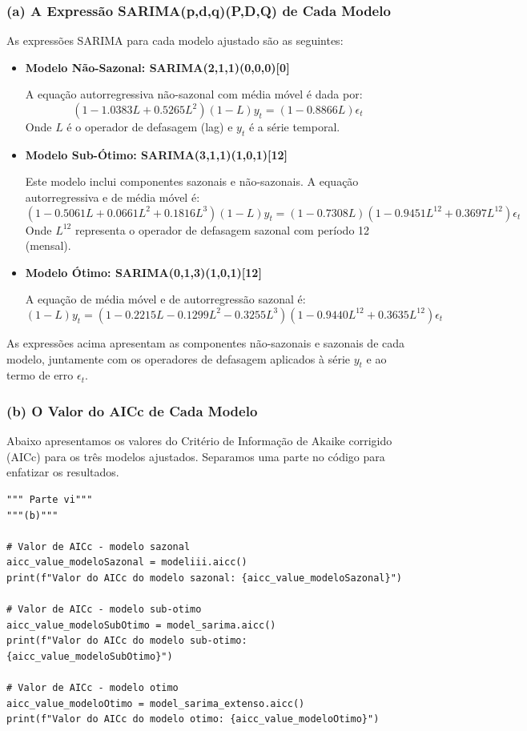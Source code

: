 \documentclass[a4paper, 12pt]{article}
\begin{document}
\subsubsection{(a) A Expressão SARIMA(p,d,q)(P,D,Q) de Cada Modelo}

As expressões SARIMA para cada modelo ajustado são as seguintes:

\begin{itemize}
    \item \textbf{Modelo Não-Sazonal: SARIMA(2,1,1)(0,0,0)[0]}
    
    A equação autorregressiva não-sazonal com média móvel é dada por:
    \[
    (1 - 1.0383L + 0.5265L^2)(1 - L)y_t = (1 - 0.8866L)\epsilon_t
    \]
    Onde \(L\) é o operador de defasagem (lag) e \(y_t\) é a série temporal. 

    \item \textbf{Modelo Sub-Ótimo: SARIMA(3,1,1)(1,0,1)[12]}
    
    Este modelo inclui componentes sazonais e não-sazonais. A equação autorregressiva e de média móvel é:
    \[
    (1 - 0.5061L + 0.0661L^2 + 0.1816L^3)(1 - L)y_t = (1 - 0.7308L)(1 - 0.9451L^{12} + 0.3697L^{12})\epsilon_t
    \]
    Onde \(L^{12}\) representa o operador de defasagem sazonal com período 12 (mensal).
    
    \item \textbf{Modelo Ótimo: SARIMA(0,1,3)(1,0,1)[12]}
    
    A equação de média móvel e de autorregressão sazonal é:
    \[
    (1 - L)y_t = (1 - 0.2215L - 0.1299L^2 - 0.3255L^3)(1 - 0.9440L^{12} + 0.3635L^{12})\epsilon_t
    \]
\end{itemize}

As expressões acima apresentam as componentes não-sazonais e sazonais de cada modelo, juntamente com os operadores de defasagem aplicados à série \(y_t\) e ao termo de erro \(\epsilon_t\).





\subsubsection{(b) O Valor do AICc de Cada Modelo}

Abaixo apresentamos os valores do Critério de Informação de Akaike corrigido (AICc) para os três modelos ajustados. Separamos uma parte no código para enfatizar os resultados.

\begin{lstlisting}[style=python]
""" Parte vi"""
"""(b)"""

# Valor de AICc - modelo sazonal
aicc_value_modeloSazonal = modeliii.aicc()
print(f"Valor do AICc do modelo sazonal: {aicc_value_modeloSazonal}")

# Valor de AICc - modelo sub-otimo
aicc_value_modeloSubOtimo = model_sarima.aicc()
print(f"Valor do AICc do modelo sub-otimo: {aicc_value_modeloSubOtimo}")

# Valor de AICc - modelo otimo
aicc_value_modeloOtimo = model_sarima_extenso.aicc()
print(f"Valor do AICc do modelo otimo: {aicc_value_modeloOtimo}")

\end{lstlisting}
\end{document}
